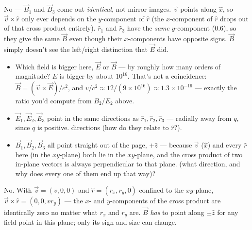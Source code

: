\documentclass[12pt]{article}
\newcommand{\ANS}[1]{\textcolor{accent}{#1}}
\newcommand{\disc}[1]{{\small\color{accent} #1}}
\begin{document}
\disc{No --- $\vec B_1$ and $\vec B_3$ come out \emph{identical}, not mirror
images. $\vec v$ points along $\hat x$, so $\vec v\times\hat r$ only ever
depends on the $y$-component of $\hat r$ (the $x$-component of $\hat r$
drops out of that cross product entirely). $\hat r_1$ and $\hat r_3$ have
the \emph{same} $y$-component (0.6), so they give the same $\vec B$ even
though their $x$-components have opposite signs. $\vec B$ simply doesn't
see the left/right distinction that $\vec E$ did.}


\begin{itemize}[itemsep=6pt,parsep=2pt,topsep=2pt]
\item Which field is bigger here, $\vec E$ or $\vec B$ --- by roughly how
many orders of magnitude? \ANS{$E$ is bigger by about $10^{16}$. That's not
a coincidence: $\vec B = (\vec v\times\vec E)/c^2$, and $v/c^2 \approx
12/(9\times10^{16})\approx1.3\times10^{-16}$ --- exactly the ratio you'd
compute from $B_2/E_2$ above.}
\item $\vec E_1,\vec E_2,\vec E_3$ point in \ANS{the same directions as
$\hat r_1,\hat r_2,\hat r_3$ --- radially away from $q$, since $q$ is
positive.} directions (how do they relate to $\hat r$?).
\item $\vec B_1,\vec B_2,\vec B_3$ all point \ANS{straight out of the page,
$+\hat z$ --- because $\vec v$ ($\hat x$) and every $\hat r$ here (in the
$xy$-plane) both lie in the $xy$-plane, and the cross product of two
in-plane vectors is always perpendicular to that plane.} (what direction, and
why does every one of them end up that way)?
\end{itemize}


\disc{No. With $\vec v=(v,0,0)$ and $\hat r=(r_x,r_y,0)$ confined to the
$xy$-plane, $\vec v\times\hat r=(0,0,vr_y)$ --- the $x$- and $y$-components
of the cross product are identically zero no matter what $r_x$ and $r_y$
are. $\vec B$ \emph{has} to point along $\pm\hat z$ for any field point in
this plane; only its sign and size can change.}

\end{document}
